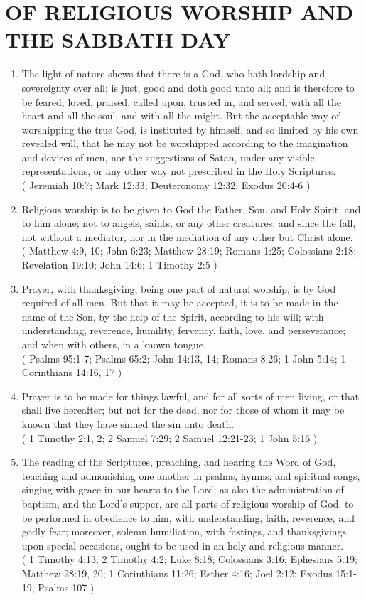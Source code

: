 \documentclass[12pt,a4paper]{book}
\begin{document}
\chapter{OF RELIGIOUS WORSHIP AND THE SABBATH DAY}
\label{ch-rel-wor}
\begin{enumerate}
\item The light of nature shews that there is a God, who hath lordship and sovereignty over all; is just, good and doth good unto all; and is therefore to be feared, loved, praised, called upon, trusted in, and served, with all the heart and all the soul, and with all the might. But the acceptable way of worshipping the true God, is instituted by himself, and so limited by his own revealed will, that he may not be worshipped according to the imagination and devices of men, nor the suggestions of Satan, under any visible representations, or any other way not prescribed in the Holy Scriptures.\\
( Jeremiah 10:7; Mark 12:33; Deuteronomy 12:32; Exodus 20:4-6 )
\item Religious worship is to be given to God the Father, Son, and Holy Spirit, and to him alone; not to angels, saints, or any other creatures; and since the fall, not without a mediator, nor in the mediation of any other but Christ alone.\\
( Matthew 4:9, 10; John 6:23; Matthew 28:19; Romans 1:25; Colossians 2:18; Revelation 19:10; John 14:6; 1 Timothy 2:5 )
\item Prayer, with thanksgiving, being one part of natural worship, is by God required of all men. But that it may be accepted, it is to be made in the name of the Son, by the help of the Spirit, according to his will; with understanding, reverence, humility, fervency, faith, love, and perseverance; and when with others, in a known tongue.\\
( Psalms 95:1-7; Psalms 65:2; John 14:13, 14; Romans 8:26; 1 John 5:14; 1 Corinthians 14:16, 17 )
\item Prayer is to be made for things lawful, and for all sorts of men living, or that shall live hereafter; but not for the dead, nor for those of whom it may be known that they have sinned the sin unto death.\\
( 1 Timothy 2:1, 2; 2 Samuel 7:29; 2 Samuel 12:21-23; 1 John 5:16 )
\item The reading of the Scriptures, preaching, and hearing the Word of God, teaching and admonishing one another in psalms, hymns, and spiritual songs, singing with grace in our hearts to the Lord; as also the administration of baptism, and the Lord's supper, are all parts of religious worship of God, to be performed in obedience to him, with understanding, faith, reverence, and godly fear; moreover, solemn humiliation, with fastings, and thanksgivings, upon special occasions, ought to be used in an holy and religious manner.\\
( 1 Timothy 4:13; 2 Timothy 4:2; Luke 8:18; Colossians 3:16; Ephesians 5:19; Matthew 28:19, 20; 1 Corinthians 11:26; Esther 4:16; Joel 2:12; Exodus 15:1-19, Psalms 107 )


\end{enumerate}
\end{document}
